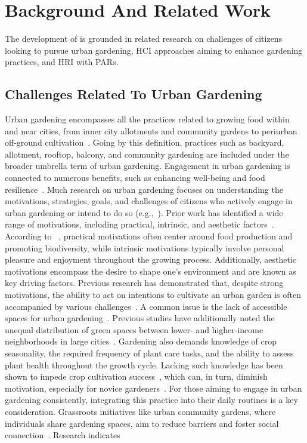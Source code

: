 \section{Background And Related Work}
\label{sec:rel}
The development of \system is grounded in related research on challenges of citizens looking to pursue urban gardening, HCI approaches aiming to enhance gardening practices, and HRI with PARs. 
\subsection{Challenges Related To Urban Gardening}\label{subsec:rel-challenges} Urban gardening encompasses all the practices related to growing food within and near cities, from inner city allotments and community gardens to periurban off-ground cultivation~\cite{ernwein2014a}. Going by this definition, practices such as backyard, allotment, rooftop, balcony, and community gardening are included under the broader umbrella term of urban gardening. Engagement in urban gardening is connected to numerous benefits, such as enhancing well-being and food resilience~\cite{opitz2016,brown2000,garcia2018}. Much research on urban gardening focuses on understanding the motivations, strategies, goals, and challenges of citizens who actively engage in urban gardening or intend to do so (e.g.,~\cite{lewis2018, schupp2016,urbanGardeningGroupsCompanion,CommunityGardenParticipatory}). Prior work has identified a wide range of motivations, including practical, intrinsic, and aesthetic factors~\cite{murtagh2023}. According to ~\citet{murtagh2023}, practical motivations often center around food production and promoting biodiversity, while intrinsic motivations typically involve personal pleasure and enjoyment throughout the growing process. Additionally, aesthetic motivations encompass the desire to shape one’s environment and are known as key driving factors. Previous research has demonstrated that, despite strong motivations, the ability to act on intentions to cultivate an urban garden is often accompanied by various challenges~\cite{guitart2012, goddard2013barriersa, goodfellowbarriers2022}. A common issue is the lack of accessible spaces for urban gardening~\cite{conwaybarriers2016c, goddard2010, schupp2016, goodfellowbarriers2022, space_apparicio2013predictors, space_conway2014tending}. Previous studies have additionally noted the unequal distribution of green spaces between lower- and higher-income neighborhoods in large cities~\cite{unequal1,unequal2,unequal3}. Gardening also demands knowledge of crop seasonality, the required frequency of plant care tasks, and the ability to assess plant health throughout the growth cycle. Lacking such knowledge has been shown to impede crop cultivation success~\cite{goodfellowbarriers2022,cerda2022}, which can, in turn, diminish motivation, especially for novice gardeners~\cite{conwaybarriers2016c}. For those aiming to engage in urban gardening consistently, integrating this practice into their daily routines is a key consideration. Grassroots initiatives like urban community gardens, where individuals share gardening spaces, aim to reduce barriers and foster social connection~\cite{guitart2012, urbanGardeningGroupsCompanion}. Research indicates 